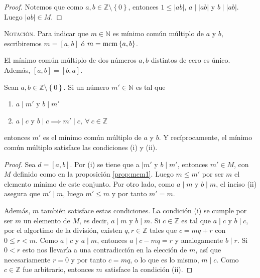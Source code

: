\begin{proof}
Notemos que como $a,b\in \mathbb{Z}\setminus \left\{0\right\}$, entonces $1\leq |a b|$, $a \mid |a b|$ y $b \mid |a b|$. Luego $|a b|\in M$.
\end{proof}
\textsc{Notación}. Para indicar que $m\in \mathbb{N}$ es mínimo común múltiplo de $a$ y $b$, escribiremos $m=[a,b]$ ó $m=\textnormal{mcm}\left\{a,b\right\}$.

\begin{remark}
El mínimo común múltiplo de dos números $a,b$ distintos de cero es único. Además, $[a,b]=[b,a]$.
\end{remark}
\begin{proposition}
Sean $a,b\in \mathbb{Z}\setminus\left\{0\right\}$. Si un número $m'\in \mathbb{N}$ es tal que 

\begin{enumerate}[label=\textnormal{(\roman*)}]
	\item $a \mid m'$ y $b \mid m'$
	\item $a \mid c$ y $b \mid c \implies m' \mid c,\:\forall \: c\in \mathbb{Z}$
\end{enumerate}
entonces $m'$ es el mínimo común múltiplo de $a$ y $b$. Y recíprocamente, el mínimo común múltiplo satisface las condiciones (i) y (ii).
\end{proposition}
\begin{proof}
Sea $d=[a,b]$. Por (i) se tiene que a $\mid m'$ y $b \mid m'$, entonces $m'\in M$, con $M$ definido como en la proposición \eqref{prop:mcm1}. Luego $m\leq m'$ por ser $m$ el elemento mínimo de este conjunto. Por otro lado, como $a \mid m$ y $b \mid m$, el inciso (ii) asegura que $m' \mid m$, luego $m'\leq m$ y por tanto $m'=m$.
\bigskip

Además, $m$ también satisface estas condiciones. La condición (i) se cumple por ser $m$ un elemento de $M$, es decir, $a \mid m$ y $b \mid m$. Si $c\in \mathbb{Z}$ es tal que $a \mid c$ y $b \mid c$, por el algortimo de la división, existen $q,r\in \mathbb{Z}$ tales que $c=mq+r$ con $0\leq r<m$. Como $a \mid c$ y $a \mid m$, entonces $a \mid c-mq=r$ y analogamente $b \mid r$. Si $0<r$ esto nos llevaría a una contradicción en la elección de $m$, así que necesariamente $r=0$ y por tanto $c=mq$, o lo que es lo mismo, $m \mid c$. Como $c\in \mathbb{Z}$ fue arbitrario, entonces $m$ satisface la condición (ii).
\end{proof}

